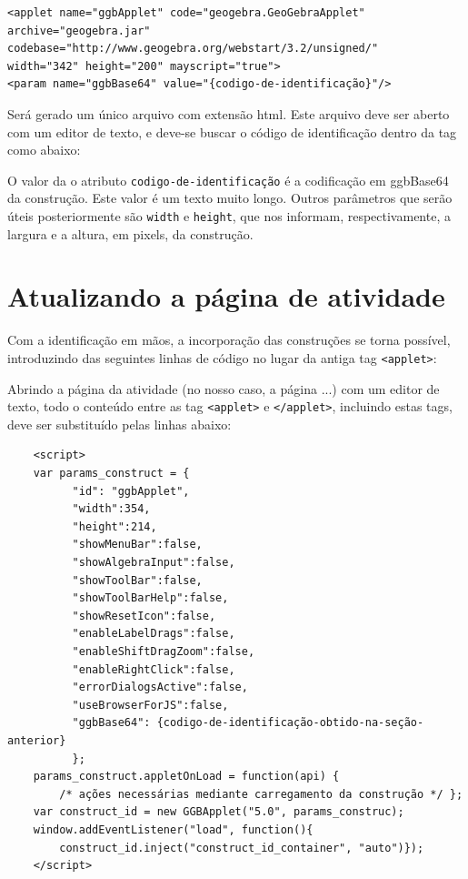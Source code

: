 \begin{verbatim}
<applet name="ggbApplet" code="geogebra.GeoGebraApplet"
archive="geogebra.jar"
codebase="http://www.geogebra.org/webstart/3.2/unsigned/"
width="342" height="200" mayscript="true">
<param name="ggbBase64" value="{codigo-de-identificação}"/>
\end{verbatim}

Será gerado um único arquivo com extensão html. Este arquivo deve ser aberto com um editor de texto, e deve-se buscar o código de identificação dentro da tag como abaixo: 

O valor da o atributo \texttt{codigo-de-identificação} é a codificação em ggbBase64 da construção. Este valor é um texto muito longo. Outros parâmetros que serão úteis posteriormente são \texttt{width} e \texttt{height}, que nos informam, respectivamente, a largura e a altura, em pixels, da construção.

\section{Atualizando a página de atividade}

Com a identificação em mãos, a incorporação das construções se torna possível, introduzindo das seguintes linhas de código no lugar da antiga tag \texttt{<applet>}:

Abrindo a página da atividade (no nosso caso, a página ...) com um editor de texto, todo o conteúdo entre as tag \texttt{<applet>} e \texttt{</applet>}, incluindo estas tags, deve ser substituído pelas linhas abaixo:


\begin{verbatim}
    <script>
    var params_construct = {
          "id": "ggbApplet",
          "width":354,
          "height":214,
          "showMenuBar":false,
          "showAlgebraInput":false,
          "showToolBar":false,
          "showToolBarHelp":false,
          "showResetIcon":false,
          "enableLabelDrags":false,
          "enableShiftDragZoom":false,
          "enableRightClick":false,
          "errorDialogsActive":false,
          "useBrowserForJS":false,
          "ggbBase64": {codigo-de-identificação-obtido-na-seção-anterior}
          };
    params_construct.appletOnLoad = function(api) {
        /* ações necessárias mediante carregamento da construção */ };
    var construct_id = new GGBApplet("5.0", params_construc);
    window.addEventListener("load", function(){
        construct_id.inject("construct_id_container", "auto")});
    </script>
\end{verbatim}

